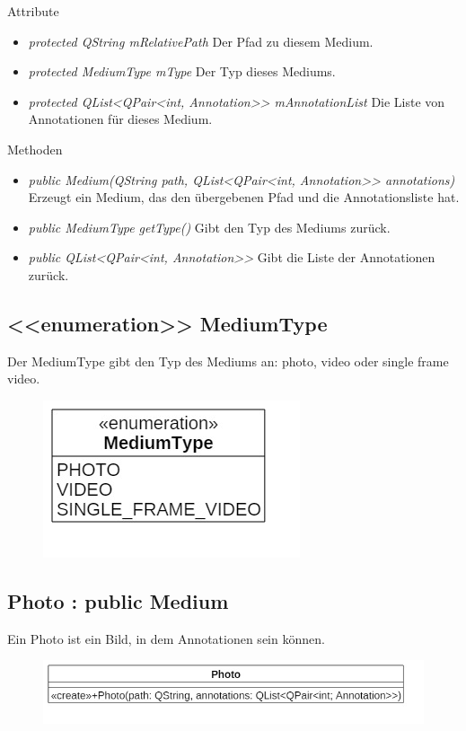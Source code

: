 Attribute
\begin{itemize}
\item\textit{protected QString mRelativePath} Der Pfad zu diesem Medium.
\item\textit{protected MediumType mType} Der Typ dieses Mediums.
\item\textit{protected QList<QPair<int, Annotation>> mAnnotationList} Die Liste von Annotationen für dieses Medium.
\end{itemize}

Methoden
\begin{itemize}
\item \textit{public Medium(QString path, QList<QPair<int, Annotation>> annotations)} Erzeugt ein Medium, das den übergebenen Pfad und die Annotationsliste hat.
\item \textit{public MediumType getType()} Gibt den Typ des Mediums zurück.
\item \textit{public QList<QPair<int, Annotation>>} Gibt die Liste der Annotationen zurück.
\end{itemize}

\subsection*{<<enumeration>> MediumType}
Der MediumType gibt den Typ des Mediums an: photo, video oder single frame video.

\begin{figure}[H]
\centering
\includegraphics[scale=0.5]{img/Klassendiagramm/Klassen/Model/MediumType}
\label{fig:mediumType}
\end{figure}

\subsection*{Photo : public Medium}
Ein Photo ist ein Bild, in dem Annotationen sein können.

\begin{figure}[H]
\centering
\includegraphics[scale=0.5]{img/Klassendiagramm/Klassen/Model/Photo}
\label{fig:photo}
\end{figure}

